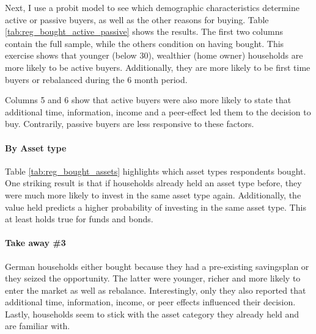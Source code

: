\documentclass[ProjectABM]{subfiles}
\begin{document}

Next, I use a probit model to see which demographic characteristics determine active or passive buyers, as well as the other reasons for buying. Table \ref{tab:reg_bought_active_passive} shows the results. The first two columns contain the full sample, while the others condition on having bought. This exercise shows that younger (below 30), wealthier (home owner) households are more likely to be active buyers. Additionally, they are more likely to be first time buyers or rebalanced during the 6 month period.

Columns 5 and 6 show that active buyers were also more likely to state that additional time, information, income and a peer-effect led them to the decision to buy. Contrarily, passive buyers are less responsive to these factors.




\paragraph{By Asset type}
Table \ref{tab:reg_bought_assets} highlights which asset types respondents bought. One striking result is that if households already held an asset type before, they were much more likely to invest in the same asset type again. Additionally, the value held predicts a higher probability of investing in the same asset type. This at least holds true for funds and bonds. %



\paragraph{Take away \#3}
German households either bought because they had a pre-existing savingsplan or they seized the opportunity. The latter were younger, richer and more likely to enter the market as well as rebalance. Interestingly, only they also reported that additional time, information, income, or peer effects influenced their decision. Lastly, households seem to stick with the asset category they already held and are familiar with.
\end{document}
